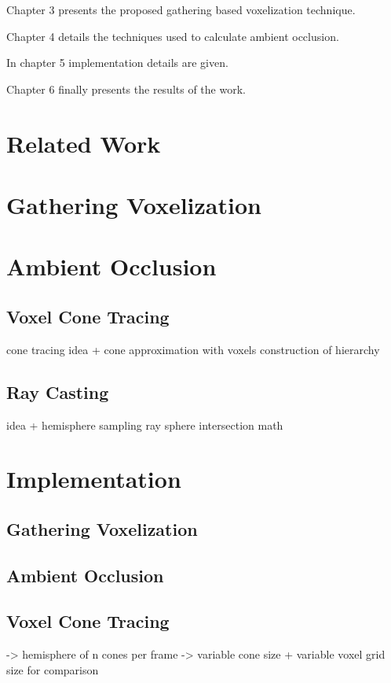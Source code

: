 \documentclass[hyperref,german,diplominf]{cgvpub}
\begin{document}
Chapter 3 presents the proposed gathering based voxelization technique. 

Chapter 4 details the techniques used to calculate ambient occlusion.

In chapter 5 implementation details are given.

Chapter 6 finally presents the results of the work.



\chapter{Related Work}

\chapter{Gathering Voxelization}

\chapter{Ambient Occlusion}

\section{Voxel Cone Tracing}
cone tracing idea + cone approximation with voxels
construction of hierarchy

\section{Ray Casting}
idea + hemisphere sampling
ray sphere intersection math


\chapter{Implementation}

\section{Gathering Voxelization}

\section{Ambient Occlusion}

\section{Voxel Cone Tracing}
-> hemisphere of n cones per frame
-> variable cone size + variable voxel grid size for comparison
\end{document}
